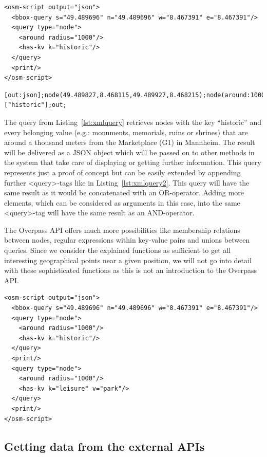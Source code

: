 \documentclass[journal]{IEEEtran}
\begin{document}
\begin{lstlisting}[caption={Overpass~query~in~XML~format},label={lst:xmlquery}]
<osm-script output="json">
  <bbox-query s="49.489696" n="49.489696" w="8.467391" e="8.467391"/>
  <query type="node">
    <around radius="1000"/>
    <has-kv k="historic"/>
  </query>
  <print/>
</osm-script>
\end{lstlisting}

\begin{lstlisting}[caption={Overpass~query~in~Overpass~Query~Language},label={lst:overpassquery}]
[out:json];node(49.489827,8.468115,49.489927,8.468215);node(around:1000)["historic"];out;
\end{lstlisting}


The query from Listing~\ref{lst:xmlquery} retrieves nodes with the key “historic” and every belonging value (e.g.: monuments, memorials, ruins or shrines) that are around a thousand meters from the Marketplace (G1) in Mannheim. The result will be delivered as a JSON object which will be passed on to other methods in the system that take care of displaying or getting further information. This query represents just a proof of concept but can be easily extended by appending further <query>-tags like in Listing~\ref{lst:xmlquery2}. This query will have the same result as it would be concatenated with an OR-operator. Adding more elements, which can be considered as arguments in this case, into the same <query>-tag will have the same result as an AND-operator.

The Overpass API offers much more possibilities like membership relations between nodes, regular expressions within key-value pairs and unions between queries. Since we consider the explained functions as sufficient to get all interesting geographical points near a given position, we will not go into detail with these sophisticated functions as this is not an introduction to the Overpass API.

\begin{lstlisting}[caption={Enhanced~Overpass~query~in~XML~format},label={lst:xmlquery2}]
<osm-script output="json">
  <bbox-query s="49.489696" n="49.489696" w="8.467391" e="8.467391"/>
  <query type="node">
    <around radius="1000"/>
    <has-kv k="historic"/>
  </query>
  <print/>
  <query type="node">
    <around radius="1000"/>
    <has-kv k="leisure" v="park"/>
  </query>
  <print/>
</osm-script>
\end{lstlisting}


\subsection{Getting data from the external APIs}
\end{document}
